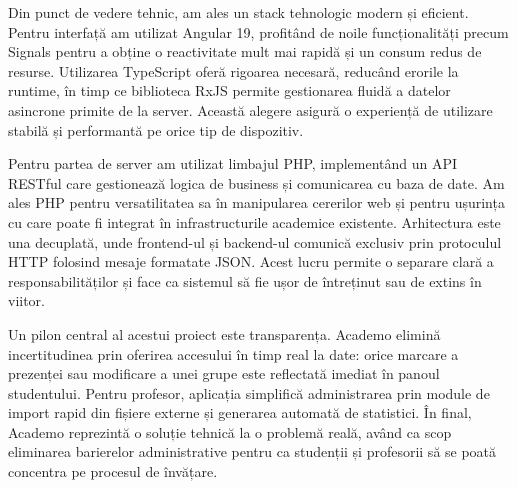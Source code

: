 Din punct de vedere tehnic, am ales un stack tehnologic modern și eficient. Pentru interfață am utilizat Angular 19,
profitând de noile funcționalități precum Signals pentru a obține o reactivitate mult mai rapidă și un consum redus de resurse.
Utilizarea TypeScript oferă rigoarea necesară, reducând erorile la runtime, în timp ce biblioteca RxJS permite gestionarea
fluidă a datelor asincrone primite de la server. Această alegere asigură o experiență de utilizare stabilă și performantă pe orice tip de dispozitiv.

Pentru partea de server am utilizat limbajul PHP, implementând un API RESTful care gestionează logica de business
și comunicarea cu baza de date. Am ales PHP pentru versatilitatea sa în manipularea cererilor web și pentru ușurința
cu care poate fi integrat în infrastructurile academice existente. Arhitectura este una decuplată, unde frontend-ul
și backend-ul comunică exclusiv prin protoculul HTTP folosind mesaje formatate JSON. Acest lucru permite o separare clară a responsabilităților
și face ca sistemul să fie ușor de întreținut sau de extins în viitor.

Un pilon central al acestui proiect este transparența. Academo elimină incertitudinea prin oferirea accesului în timp 
real la date: orice marcare a prezenței sau modificare a unei grupe este reflectată imediat în panoul studentului. 
Pentru profesor, aplicația simplifică administrarea prin module de import rapid din fișiere externe și generarea 
automată de statistici. În final, Academo reprezintă o soluție tehnică la o problemă reală, având ca scop eliminarea 
barierelor administrative pentru ca studenții și profesorii să se poată concentra pe procesul de învățare.

\newpage